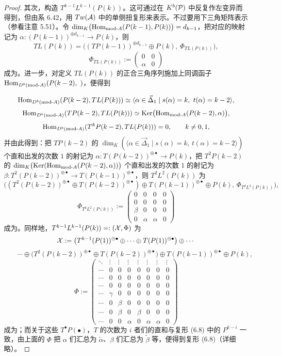 \begin{proof}
其次，构造 $T^{k-1}L^{k-1}(P(k))$。这可通过在 $K^{b}(\mathcal{P})$ 中反复作左变异而得到，但由系 6.42，用 $Tw(\mathcal{A})$ 中的单侧扭复形来表示。不过要用下三角矩阵表示（参看注意 5.51）。令 $\dim_K\bigl(\operatorname{Hom}_{\mathrm{mod}\text{-}A}(P(k-1),P(k))\bigr)=d_{k-1}$，把对应的映射记为 $\alpha\colon(P(k-1))^{\oplus d_{k-1}}\to P(k)$，则
\[
TL(P(k))=\bigl((TP(k-1))^{\oplus d_{k-1}}\oplus P(k),\ \Phi_{TL(P(k))}\bigr),
\]
\[
\Phi_{TL(P(k))}:=
\begin{pmatrix}
0 & 0\\
\alpha & 0
\end{pmatrix}
\]
成为。进一步，对定义 $TL(P(k))$ 的正合三角序列施加上同调函子 $\operatorname{Hom}_{D^{b}(\mathrm{mod}\text{-}A)}(P(k-2),\ )$，便得到

\[
\operatorname{Hom}_{D^{b}(\mathrm{mod}\text{-}A)}(P(k-2),TL(P(k)))\simeq\langle\alpha\in\vec{\Delta}_1\mid s(\alpha)=k,\ t(\alpha)=k-2\rangle,
\]
\[
\operatorname{Hom}_{D^{b}(\mathrm{mod}\text{-}A)}(TP(k-2),TL(P(k)))\simeq\operatorname{Ker}\bigl(\operatorname{Hom}_{\mathrm{mod}\text{-}A}(P(k-2),\alpha)\bigr),
\]
\[
\operatorname{Hom}_{D^{b}(\mathrm{mod}\text{-}A)}(T^{k}P(k-2),TL(P(k)))=0,\qquad k\neq 0,1,
\]
并由此得到：把 $TP(k-2)$ 的 $\dim_K(\langle\alpha\in\vec{\Delta}_1\mid s(\alpha)=k,\ t(\alpha)=k-2\rangle)$ 个直和出发的次数 $1$ 的射记为 $\alpha\colon T(P(k-2))^{\oplus\bullet}\to P(k)$，把 $T^{2}P(k-2)$ 的 $\dim_K\bigl(\operatorname{Ker}(\operatorname{Hom}_{\mathrm{mod}\text{-}A}(P(k-2),\alpha))\bigr)$ 个直和出发的次数 $1$ 的射记为 $\beta\colon T^{2}(P(k-2))^{\oplus\bullet}\to T(P(k-1))^{\oplus\bullet}$，则 $T^{2}L^{2}(P(k))$ 为
\[
\bigl((T^{2}(P(k-2))^{\oplus\bullet}\oplus T(P(k-2))^{\oplus\bullet})\oplus T(P(k-1))^{\oplus\bullet}\oplus P(k),\ \Phi_{T^{2}L^{2}(P(k))}\bigr),
\]
\[
\Phi_{T^{2}L^{2}(P(k))}:=
\left(\begin{array}{cc|c|c}
0 & 0 & 0 & 0\\
0 & 0 & 0 & 0\\ \hline
\beta & 0 & 0 & 0\\ \hline
0 & \alpha & \alpha & 0
\end{array}\right)
\]
成为。同样地，$T^{k-1}L^{k-1}(P(k))=:(\mathcal{X},\Phi)$ 为
\[
\mathcal{X}:=\bigl(T^{k-1}(P(1))^{\oplus\bullet}\oplus\cdots\oplus T(P(1))^{\oplus\bullet}\bigr)\oplus\cdots
\]
\[
\qquad\cdots\oplus\bigl(T^{2}(P(k-2))^{\oplus\bullet}\oplus T(P(k-2))^{\oplus\bullet}\bigr)\oplus T(P(k-1))^{\oplus\bullet}\oplus P(k),
\]
\[
\Phi:=
\left(\begin{array}{c|ccc|cc|c|c}
\ddots & \vdots & \vdots & \vdots & \vdots & \vdots & \vdots & \vdots\\ \hline
\cdots & 0 & 0 & 0 & 0 & 0 & 0 & 0\\
\cdots & 0 & 0 & 0 & 0 & 0 & 0 & 0\\
\cdots & 0 & 0 & 0 & 0 & 0 & 0 & 0\\ \hline
\cdots & \gamma & 0 & 0 & 0 & 0 & 0 & 0\\
\cdots & 0 & \beta & 0 & 0 & 0 & 0 & 0\\ \hline
\cdots & 0 & \beta & 0 & \beta & 0 & 0 & 0\\ \hline
\cdots & 0 & 0 & \alpha & 0 & \alpha & \alpha & 0
\end{array}\right)
\]
成为；而关于这些 $T^{\bullet}P(\bullet)$，$T$ 的次数为 $i$ 者们的直和与复形 (6.8) 中的 $P^{k-i}$ 一致，由上面的 $\Phi$ 把 $\alpha$ 们汇总为 $\tilde\alpha$、$\beta$ 们汇总为 $\tilde\beta$ 等，便得到复形 (6.8)（详细略）。
\end{proof}

